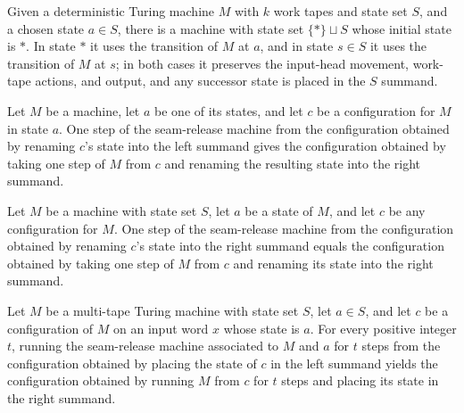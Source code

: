 \begin{definition}
\label{Turing.seamReleaseTM}
\leanok
{}
Given a deterministic Turing machine $M$ with $k$ work tapes and state set $S$, and a
chosen state $a\in S$, there is a machine with state set $\{\ast\}\sqcup S$ whose
initial state is $\ast$. In state $\ast$ it uses the transition of $M$ at $a$, and in
state $s\in S$ it uses the transition of $M$ at $s$; in both cases it preserves the
input-head movement, work-tape actions, and output, and any successor state is placed in
the $S$ summand.
\end{definition}

\begin{theorem}
\label{Turing.seamReleaseTM_step_fresh}
\leanok
{}
Let $M$ be a machine, let $a$ be one of its states, and let $c$ be a configuration for
$M$ in state $a$. One step of the seam-release machine from the configuration obtained
by renaming $c$'s state into the left summand gives the configuration obtained by taking
one step of $M$ from $c$ and renaming the resulting state into the right summand.
\end{theorem}

\begin{theorem}
\label{Turing.seamReleaseTM_step_inr}
\leanok
{}
Let $M$ be a machine with state set $S$, let $a$ be a state of $M$, and let $c$ be any
configuration for $M$. One step of the seam-release machine from the configuration
obtained by renaming $c$'s state into the right summand equals the configuration
obtained by taking one step of $M$ from $c$ and renaming its state into the right
summand.
\end{theorem}

\begin{theorem}
\label{Turing.seamReleaseTM_runFrom_pos}
\leanok
{}
Let $M$ be a multi-tape Turing machine with state set $S$, let $a\in S$, and let $c$ be
a configuration of $M$ on an input word $x$ whose state is $a$. For every positive
integer $t$, running the seam-release machine associated to $M$ and $a$ for $t$ steps
from the configuration obtained by placing the state of $c$ in the left summand yields
the configuration obtained by running $M$ from $c$ for $t$ steps and placing its state
in the right summand.
\end{theorem}

